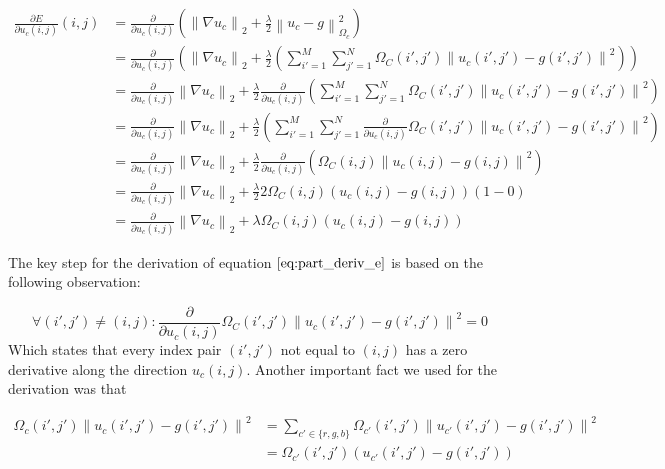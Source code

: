\documentclass{paper}
\newcommand{\norm}[1]{\left\lVert#1\right\rVert}
\begin{document}
\begin{align}
	\frac{\partial{E}}{\partial{u_{c} (i,j)}}(i,j)
	&= \frac{\partial}{\partial{u_{c} (i,j)}} \left( \norm{\nabla u_c}_2 + \frac{\lambda}{2} \norm{u_c - g}^2_{\Omega_{c}} \right) \nonumber \\
	&= \frac{\partial}{\partial{u_{c} (i,j)}} \left( \norm{\nabla u_c}_2 + \frac{\lambda}{2} \left( \sum_{i'=1}^M \sum_{j'=1}^N \Omega_{C}(i',j')\norm{u_{c}(i',j') - g(i',j')}^2
\right) \right) \nonumber \\
&= \frac{\partial}{\partial{u_{c} (i,j)}} \norm{\nabla u_c}_2 + \frac{\lambda}{2} \frac{\partial}{\partial{u_{c} (i,j)}}  \left( \sum_{i'=1}^M \sum_{j'=1}^N \Omega_{C}(i',j')\norm{u_{c}(i',j') - g(i',j')}^2
\right) \nonumber \\
&= \frac{\partial}{\partial{u_{c} (i,j)}} \norm{\nabla u_c}_2 + \frac{\lambda}{2} \left( \sum_{i'=1}^M \sum_{j'=1}^N \frac{\partial}{\partial{u_{c} (i,j)}} \Omega_{C}(i',j')\norm{u_{c}(i',j') - g(i',j')}^2
\right) \nonumber \\
&= \frac{\partial}{\partial{u_{c} (i,j)}} \norm{\nabla u_c}_2 + \frac{\lambda}{2} \frac{\partial}{\partial{u_{c} (i,j)}} \left( \Omega_{C}(i,j)\norm{u_{c}(i,j) - g(i,j)}^2 \right) \nonumber \\
&= \frac{\partial}{\partial{u_{c} (i,j)}} \norm{\nabla u_c}_2 + \frac{\lambda}{2} 2 \Omega_{C}(i,j) \left( u_{c}(i,j) - g(i,j) \right) (1-0) \nonumber \\
&= \frac{\partial}{\partial{u_{c} (i,j)}} \norm{\nabla u_c}_2 + \lambda \Omega_{C}(i,j) \left( u_{c}(i,j) - g(i,j) \right)
\label{eq:part_deriv_e}
\end{align}

The key step for the derivation of equation $\ref{eq:part_deriv_e}$ is based on the following observation: 

$$ \forall (i',j')  \neq (i,j): \frac{\partial}{\partial{u_{c} (i,j)}} \Omega_{C}(i',j')\norm{u_{c}(i',j') - g(i',j')}^2 = 0 $$
Which states that every index pair $(i',j')$ not equal to $(i,j)$ has a zero derivative along the direction $u_c(i,j)$. Another important fact we used for the derivation was that 

\begin{align}
	\Omega_{c}(i',j')\norm{u_{c}(i',j') - g(i',j')}^2
	&= \sum_{c'\in \{ r,g,b \}} \Omega_{c'}(i',j')\norm{u_{c'}(i',j') - g(i',j')}^2 \nonumber \\
	&= \Omega_{c'}(i',j')\left( u_{c'}(i',j') - g(i',j') \right)
\end{align}
\end{document}

